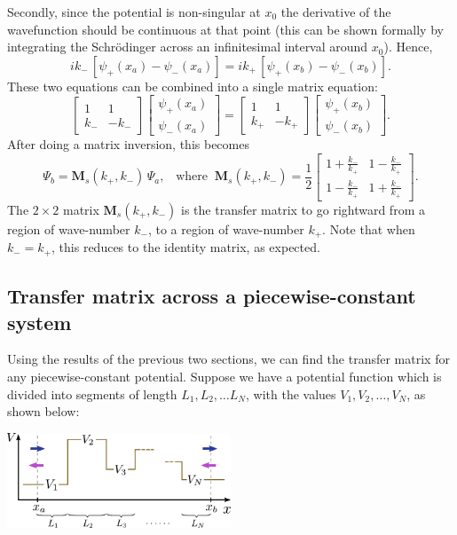 \documentclass[pra,12pt]{revtex4}
\begin{document}
Secondly, since the potential is non-singular at $x_0$ the derivative
of the wavefunction should be continuous at that point (this can be
shown formally by integrating the Schr\"odinger across an
infinitesimal interval around $x_0$).  Hence,
$$ik_-\, \left[\psi_+(x_a) - \psi_-(x_a)\right] = ik_+\, \left[\psi_+(x_b) - \psi_-(x_b)\right].$$
These two equations can be combined into a single matrix equation:
$$\begin{bmatrix}1 & 1 \\ k_- & - k_-\end{bmatrix}\begin{bmatrix}\psi_+(x_a) \\ \psi_-(x_a) \end{bmatrix} = \begin{bmatrix}1 & 1 \\ k_+ & - k_+\end{bmatrix} \begin{bmatrix}\psi_+(x_b) \\ \psi_-(x_b) \end{bmatrix}.$$
After doing a matrix inversion, this becomes
$$\Psi_b = \mathbf{M}_s(k_+,k_-) \, \Psi_a, \;\;\;\mathrm{where}\;\; \mathbf{M}_s(k_+,k_-) = \frac{1}{2} \begin{bmatrix}1+\frac{k_-}{k_+} & 1-\frac{k_-}{k_+} \\ 1-\frac{k_-}{k_+} & 1+\frac{k_-}{k_+}\end{bmatrix}.$$
The $2\times2$ matrix $\mathbf{M}_s(k_+,k_-)$ is the transfer matrix
to go rightward from a region of wave-number $k_-$, to a region of
wave-number $k_+$.  Note that when $k_- = k_+$, this reduces to the
identity matrix, as expected.

\subsection{Transfer matrix across a piecewise-constant system}

Using the results of the previous two sections, we can find the
transfer matrix for any piecewise-constant potential.  Suppose we have
a potential function which is divided into segments of length $L_1,
L_2, \dots L_N$, with the values $V_1, V_2, \dots, V_N$, as shown
below:

\begin{center}
  \includegraphics[width=0.5\textwidth]{transfer_matrix_setup2}
\end{center}
\end{document}
